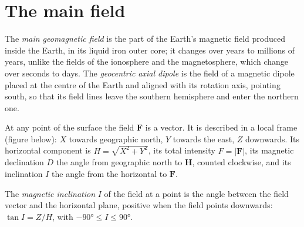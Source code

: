 \section{The main field}

\begin{definition}\label{def:b3:palaeomagnetism:main-field}
The \emph{main geomagnetic field} is the part of
the Earth's magnetic field produced inside the Earth, in its liquid iron outer
core; it changes over years to millions of years, unlike the fields of the
ionosphere and the magnetosphere, which change over seconds to days. The
\emph{geocentric axial dipole} is the field of a
magnetic dipole placed at the centre of the Earth and aligned with its rotation
axis, pointing south, so that its field lines leave the southern hemisphere and
enter the northern one.
\end{definition}

At any point of the surface the field $\mathbf F$ is a vector. It is described
in a local frame (figure below): $X$ towards geographic north, $Y$ towards the
east, $Z$ downwards. Its horizontal component is $H = \sqrt{X^2 + Y^2}$, its
total intensity $F = |\mathbf F|$, its magnetic declination $D$ the angle from
geographic north to $\mathbf H$, counted clockwise, and its inclination $I$ the
angle from the horizontal to $\mathbf F$.

\begin{definition}\label{def:b3:palaeomagnetism:inclination}
The \emph{magnetic inclination} $I$ of the field at
a point is the angle between the field vector and the horizontal plane,
positive when the field points downwards: $\tan I = Z/H$, with $-\ang{90} \le I
\le \ang{90}$.
\end{definition}

